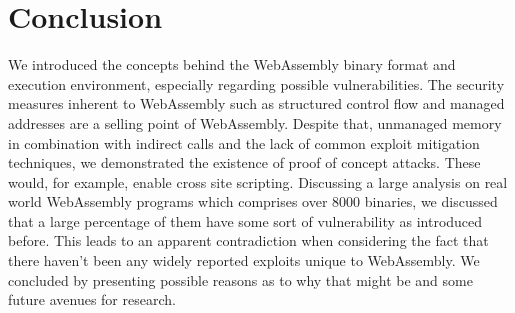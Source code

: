 \documentclass[sigconf]{acmart}
\begin{document}
\section{Conclusion}
We introduced the concepts behind the WebAssembly binary format and execution environment, especially regarding possible vulnerabilities. The security measures inherent to WebAssembly such as structured control flow and managed addresses are a selling point of WebAssembly. Despite that, unmanaged memory in combination with indirect calls and the lack of common exploit mitigation techniques, we demonstrated the existence of proof of concept attacks. These would, for example, enable cross site scripting. Discussing a large analysis on real world WebAssembly programs which comprises over 8000 binaries, we discussed that a large percentage of them have some sort of vulnerability as introduced before. This leads to an apparent contradiction when considering the fact that there haven't been any widely reported exploits unique to WebAssembly. We concluded by presenting possible reasons as to why that might be and some future avenues for research. 




\appendix
\end{document}
